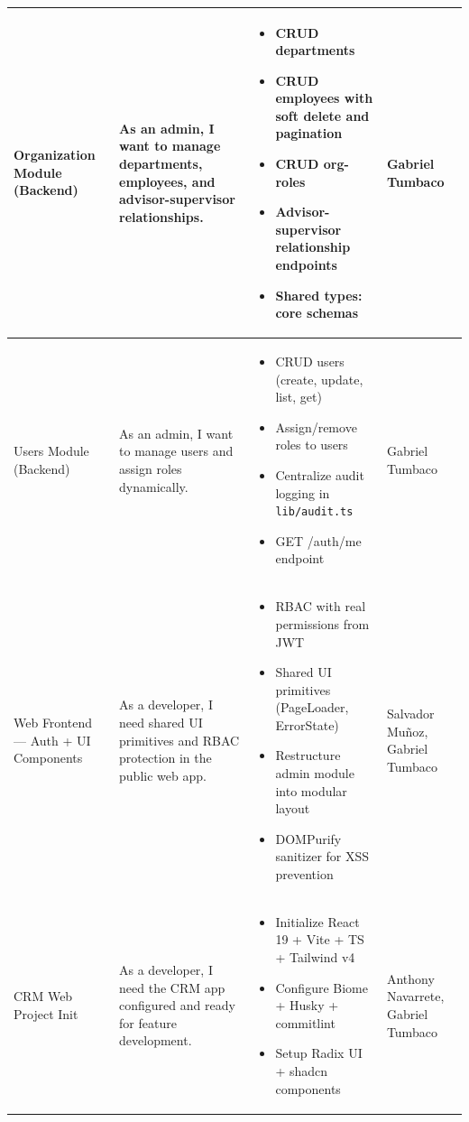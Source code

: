 \documentclass[letterpaper%
, oneside%
, 12pt%
, memoireprojet%
, english%
,creativecommons,hyperref, withAlgo2e %
]{thETS}
\begin{document}
\begin{longtable}{|p{3.2cm}|p{4.4cm}|p{5.4cm}|p{3.0cm}|}
Organization Module (Backend) & As an admin, I want to manage departments, employees, and advisor-supervisor relationships. & \begin{itemize}\setlength{\itemsep}{2pt}
    \item CRUD departments
    \item CRUD employees with soft delete and pagination
    \item CRUD org-roles
    \item Advisor-supervisor relationship endpoints
    \item Shared types: core schemas
\end{itemize} & Gabriel Tumbaco \\ \hline

Users Module (Backend) & As an admin, I want to manage users and assign roles dynamically. & \begin{itemize}\setlength{\itemsep}{2pt}
    \item CRUD users (create, update, list, get)
    \item Assign/remove roles to users
    \item Centralize audit logging in \texttt{lib/audit.ts}
    \item GET /auth/me endpoint
\end{itemize} & Gabriel Tumbaco \\ \hline

Web Frontend — Auth + UI Components & As a developer, I need shared UI primitives and RBAC protection in the public web app. & \begin{itemize}\setlength{\itemsep}{2pt}
    \item RBAC with real permissions from JWT
    \item Shared UI primitives (PageLoader, ErrorState)
    \item Restructure admin module into modular layout
    \item DOMPurify sanitizer for XSS prevention
\end{itemize} & Salvador Muñoz, Gabriel Tumbaco \\ \hline

CRM Web Project Init & As a developer, I need the CRM app configured and ready for feature development. & \begin{itemize}\setlength{\itemsep}{2pt}
    \item Initialize React 19 + Vite + TS + Tailwind v4
    \item Configure Biome + Husky + commitlint
    \item Setup Radix UI + shadcn components
\end{itemize} & Anthony Navarrete, Gabriel Tumbaco \\ \hline


\end{longtable}
\end{document}
